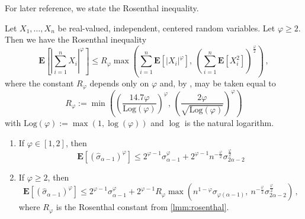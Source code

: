 \documentclass{article}
\newcommand{\lab}{\left[} %
\newcommand{\rab}{\right]} %
\newcommand{\ab}[1]{\lab #1 \rab} %
\newcommand{\abOf}[1]{\!\ab{#1}} %
\newcommand{\lb}{\left(} %
\newcommand{\rb}{\right)} %
\newcommand{\br}[1]{\lb #1 \rb} %
\newcommand{\brOf}[1]{\!\br{#1}} %
\newcommand{\absOf}[1]{\left\vert #1 \right\vert} %
\newcommand{\E}{\mathbf{E}} %
\newcommand{\EOf}[1]{\E\abOf{#1}}
\newcommand{\eqcm}{\,,} %
\begin{document}
%
For later reference, we state the Rosenthal inequality.
\begin{lemma}\label{lmm:rosenthal}
    Let $X_1, \dots, X_n$ be real-valued, independent, centered random variables. 
    Let $\varphi \geq 2$.
    Then we have the Rosenthal inequality \cite{Rosenthal1970,Johnson1985}
    \begin{equation}
        \EOf{\absOf{\sum_{i=1}^n X_i}^\varphi} \leq R_\varphi \max\brOf{ \sum_{i=1}^n\EOf{|X_i|^\varphi},\ \br{\sum_{i=1}^n \EOf{X_i^2}}^{\frac \varphi2}}
        \eqcm
    \end{equation}
    where the constant $R_\varphi$ depends only on $\varphi$ and, by \cite[Theorem 4.1, Corollary 2.6 and the remark on p.~247]{Johnson1985}, may be taken equal to
    \begin{equation}\label{eq:rosenthal-const}
        R_\varphi := \min\brOf{\br{\frac{14.7 \varphi}{\mathrm{Log}(\varphi)}}^{\varphi},\, \br{\frac{2\varphi}{\sqrt{\mathrm{Log}(\varphi)}}}^{\varphi}}
    \end{equation}
    with $\mathrm{Log}(\varphi) := \max(1, \log(\varphi))$ and $\log$ is the natural logarithm.
\end{lemma}
%
\begin{lemma}\label{lmm:power:iid:empmom}
	\mbox{}
	\begin{enumerate}[label=(\roman*)]
		\item
		If $\varphi \in [1,2]$, then
		\begin{equation}
			\EOf{\br{\hat\sigma_{\alpha-1}}^{\varphi}} 
			\leq
			2^{\varphi-1} \sigma_{\alpha-1}^{\varphi} + 2^{\varphi-1} n^{-\frac{\varphi}{2}} \sigma_{2\alpha-2}^{\frac{\varphi}{2}} 
		\end{equation}
		\item
		If $\varphi \geq 2$, then
        \begin{equation}
            \EOf{\br{\hat\sigma_{\alpha-1}}^{\varphi}}
            \leq 
            2^{\varphi-1} \sigma_{\alpha-1}^{\varphi} + 2^{\varphi-1} R_\varphi \max\brOf{ n^{1-\varphi} \sigma_{\varphi(\alpha-1)},\ n^{-\frac{\varphi}{2}} \sigma_{2\alpha-2}^{\frac{\varphi}{2}}}
            \eqcm
        \end{equation}
        where $R_\varphi$ is the Rosenthal constant from \cref{lmm:rosenthal}.
	\end{enumerate}
\end{lemma}
%
\end{document}
